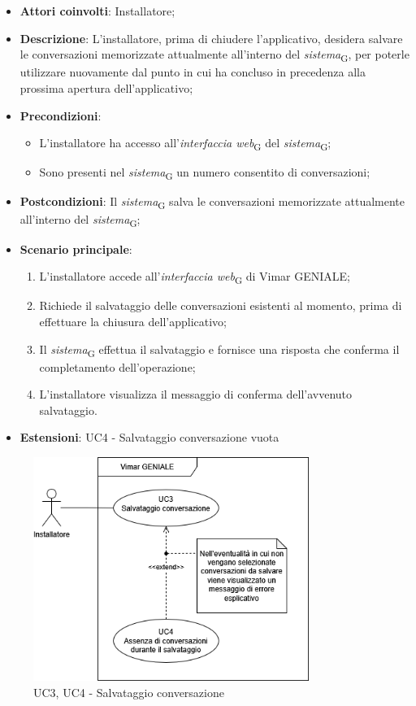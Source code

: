 \begin{itemize}
    \item \textbf{Attori coinvolti}: Installatore;
    \item \textbf{Descrizione}: L’installatore, prima di chiudere l’applicativo, desidera salvare le conversazioni memorizzate attualmente all’interno del \textit{sistema}\textsubscript{G}, per poterle utilizzare nuovamente dal punto in cui ha concluso in precedenza alla prossima apertura dell’applicativo;
    \item \textbf{Precondizioni}: 
        \begin{itemize}
            \item L’installatore ha accesso all’\textit{interfaccia web}\textsubscript{G} del \textit{sistema}\textsubscript{G};
            \item Sono presenti nel \textit{sistema}\textsubscript{G} un numero consentito di conversazioni;
        \end{itemize}
    \item \textbf{Postcondizioni}: Il \textit{sistema}\textsubscript{G} salva le conversazioni memorizzate attualmente all’interno del \textit{sistema}\textsubscript{G};
    \item \textbf{Scenario principale}:
    \begin{enumerate}
    \item L’installatore accede all’\textit{interfaccia web}\textsubscript{G} di Vimar GENIALE;
    \item Richiede il salvataggio delle conversazioni esistenti al momento, prima di effettuare la chiusura dell’applicativo;
    \item Il \textit{sistema}\textsubscript{G} effettua il salvataggio e fornisce una risposta che conferma il completamento dell’operazione;
    \item L’installatore visualizza il messaggio di conferma dell’avvenuto salvataggio.
    \end{enumerate}
    \item \textbf{Estensioni}: UC4 - Salvataggio conversazione vuota
\end{itemize}
\begin{figure}[H]
\centering
\includegraphics[width=0.8\textwidth]{contents/casi_duso/png/UC3.png}
\caption{UC3, UC4 - Salvataggio conversazione}
\end{figure}

